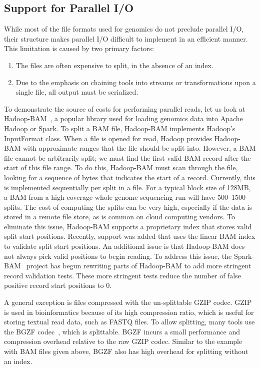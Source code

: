 \documentclass[phd]{ucbthesis}
\begin{document}
\subsection{Support for Parallel I/O}
\label{sec:parallel-io}

While most of the file formats used for genomics do not preclude parallel I/O,
their structure makes parallel I/O difficult to implement in an efficient
manner. This limitation is caused by two primary factors:

\begin{enumerate}
\item The files are often expensive to split, in the absence of an index.
\item Due to the emphasis on chaining tools into streams or transformations upon
  a single file, all output must be serialized.
\end{enumerate}

To demonstrate the source of costs for performing parallel reads, let us look at
{Hadoop-BAM}~\cite{niemenmaa12}, a popular library used for loading
genomics data into {Apache Hadoop} or {Spark}. To split a BAM file,
{Hadoop-BAM} implements {Hadoop}'s InputFormat class. When a file
is opened for read, {Hadoop} provides {Hadoop-BAM} with approximate
ranges that the file should be split into. However, a BAM file cannot be
arbitrarily split; we must find the first valid BAM record after the start of
this file range. To do this, {Hadoop-BAM} must scan through the file,
looking for a sequence of bytes that indicates the start of a record. Currently,
this is implemented sequentially per split in a file. For a typical block size
of 128MB, a BAM from a high coverage whole genome sequencing run will have
500--1500 splits. The cost of computing the splits can be very high, especially
if the data is stored in a remote file store, as is common on cloud computing
vendors. To eliminate this issue, {Hadoop-BAM} supports a proprietary
index that stores valid split start positions. Recently, support was added that
uses the linear BAM index to validate split start positions. An additional issue
is that {Hadoop-BAM} does not always pick valid positions to begin
reading. To address this issue, the {Spark-BAM}~\cite{sparkbam} project
has begun rewriting parts of {Hadoop-BAM} to add more stringent record
validation tests. These more stringent tests reduce the number of false positive
record start positions to 0.

A general exception is files compressed with the un-splittable GZIP codec.
GZIP is used in bioinformatics because of its high compression ratio,
which is useful for storing textual read data, such as FASTQ files. To allow
splitting, many tools use the BGZF codec~\cite{li11tabix}, which is splittable.
BGZF incurs a small performance and compression overhead relative to the raw
GZIP codec. Similar to the example with BAM files given above, BGZF also has
high overhead for splitting without an index.
\end{document}
